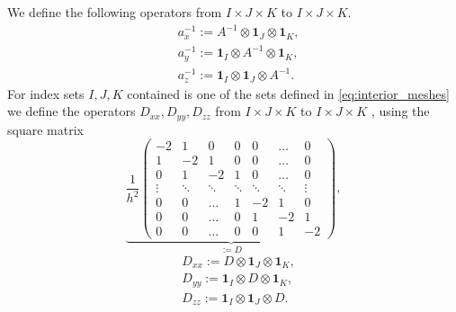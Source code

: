 \documentclass[12pt,reqno]{amsart}
\theoremstyle{definition}
\numberwithin{equation}{section}
\begin{document}
We define the following operators  from $I\times J\times K$ to $I\times J\times K$.
\begin{align*}
	&
	a_x^{-1}:=A^{-1}\otimes \mathbf{1}_J\otimes \mathbf{1}_K,\\&
		a_y^{-1}:= \mathbf{1}_I\otimes A^{-1}\otimes \mathbf{1}_K, \\&
			a_z^{-1}:= \mathbf{1}_I\otimes \mathbf{1}_J\otimes A^{-1}.
\end{align*}
For  index sets $I,J,K$  contained is one of the sets defined in \eqref{eq:interior_meshes}
 we define the operators $D_{xx},D_{yy},D_{zz}$ from $I\times J\times K$ to 
 $I\times J\times K$
 , using the square matrix 
$$
	\underbrace{
	\frac{1}{h^2}
	\begin{pmatrix}
		-2     & 1     & 0      & 0     & 0      & \dots  & 0      \\
		1     & -2     & 1      & 0      & 0      & \dots  & 0      \\
		0      & 1      & -2     & 1      & 0      & \dots  & 0      \\
		\vdots & \ddots & \ddots & \ddots & \ddots & \ddots & \vdots \\
		0      & 0      & \dots  & 1      & -2     & 1      & 0      \\
		0      & 0      & \dots  & 0      & 1      & -2    & 1      \\
		0      & 0      & \dots  & 0     & 0      & 1     & -2
\end{pmatrix}}_{:=D},
$$
\begin{align*}
	&
	D_{xx}:=D\otimes \mathbf{1}_J\otimes \mathbf{1}_K,\\&
D_{yy}:= \mathbf{1}_I\otimes D\otimes \mathbf{1}_K, \\&
D_{zz}:= \mathbf{1}_I\otimes \mathbf{1}_J\otimes D.
\end{align*}
\end{document}
